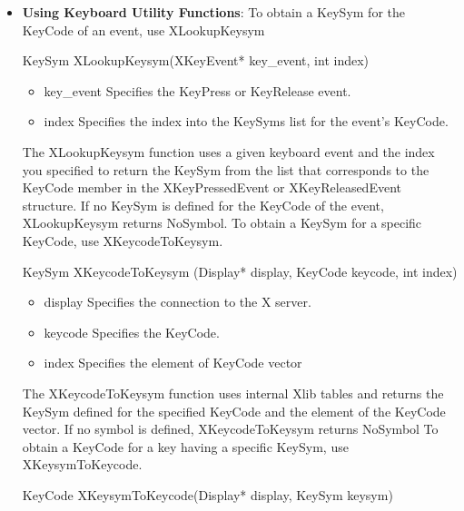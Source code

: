 \documentclass{report}
\begin{document}
\begin{itemize}
\begin{itemize}
    \end{itemize}

    \pagebreak 
    \begin{itemize}
        \item \textbf{Using Keyboard Utility Functions}: To obtain a KeySym for the KeyCode of an event, use XLookupKeysym
            \bigbreak \noindent 
            \begin{cppcode}
            KeySym XLookupKeysym(XKeyEvent* key_event, int index)
            \end{cppcode}
            \begin{itemize}
                \item key\_event Specifies the KeyPress or KeyRelease event.
                \item index Specifies the index into the KeySyms list for the event’s KeyCode.
            \end{itemize}
            The XLookupKeysym function uses a given keyboard event and the index you specified to return the KeySym from the list that corresponds to the KeyCode member in the XKeyPressedEvent or XKeyReleasedEvent structure. If no KeySym is defined for the KeyCode of the event, XLookupKeysym returns NoSymbol.
            \bigbreak \noindent 
            To obtain a KeySym for a specific KeyCode, use XKeycodeToKeysym.
            \bigbreak \noindent 
            \begin{cppcode}
            KeySym XKeycodeToKeysym (Display* display, KeyCode keycode, int index)
            \end{cppcode}
            \begin{itemize}
                \item display Specifies the connection to the X server.
                \item keycode Specifies the KeyCode.
                \item index Specifies the element of KeyCode vector
            \end{itemize}
            The XKeycodeToKeysym function uses internal Xlib tables and returns the KeySym defined for the specified KeyCode and the element of the KeyCode vector. If no symbol is defined, XKeycodeToKeysym returns NoSymbol
            \bigbreak \noindent 
            To obtain a KeyCode for a key having a specific KeySym, use XKeysymToKeycode.
            \bigbreak \noindent 
            \begin{cppcode}
            KeyCode XKeysymToKeycode(Display* display, KeySym keysym)

\end{cppcode}
\end{itemize}
\end{itemize}
\end{document}
